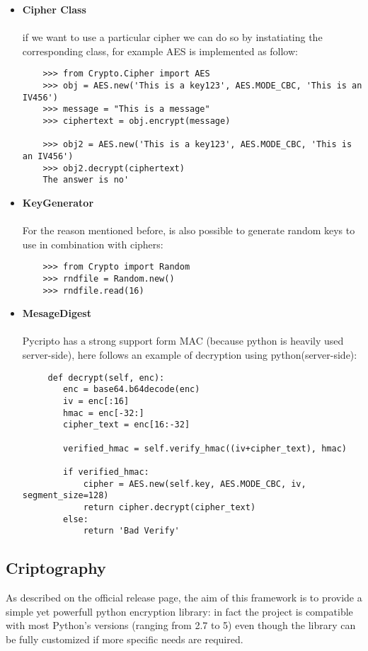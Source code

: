 \documentclass{article}
\begin{document}
\begin{itemize}
 \item \textbf{Cipher Class}\\\\
 	if we want to use a particular cipher we can do so by instatiating the corresponding class, for example AES is implemented as follow:\\
	
	\begin{verbatim}
	>>> from Crypto.Cipher import AES
	>>> obj = AES.new('This is a key123', AES.MODE_CBC, 'This is an IV456')
	>>> message = "This is a message"
	>>> ciphertext = obj.encrypt(message)

	>>> obj2 = AES.new('This is a key123', AES.MODE_CBC, 'This is an IV456')
	>>> obj2.decrypt(ciphertext)
	The answer is no'
	\end{verbatim}
  	
 	\item \textbf{KeyGenerator}\\\\
	For the reason mentioned before, is also possible to generate random keys to use in combination with ciphers:
	
	\begin{verbatim}
	>>> from Crypto import Random
	>>> rndfile = Random.new()
	>>> rndfile.read(16)
	\end{verbatim}
	
	\item \textbf{MesageDigest}\\\\
	Pycripto has a strong support form MAC (because python is heavily used server-side), here follows an example of decryption using python(server-side):
	\begin{verbatim}
	 def decrypt(self, enc):
        enc = base64.b64decode(enc)
        iv = enc[:16]
        hmac = enc[-32:]
        cipher_text = enc[16:-32]

        verified_hmac = self.verify_hmac((iv+cipher_text), hmac)

        if verified_hmac:
            cipher = AES.new(self.key, AES.MODE_CBC, iv, segment_size=128)
            return cipher.decrypt(cipher_text)
        else:
            return 'Bad Verify'
	\end{verbatim}
	\end{itemize}
	
\subsection{Criptography}
As described on the official release page, the aim of this framework is to provide a simple yet powerfull python encryption library: in fact the project is compatible with most Python's versions
(ranging from 2.7 to 5) even though the library can be fully customized if more specific needs are required.
\end{document}
